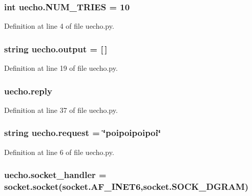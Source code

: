 \subsubsection[{\texorpdfstring{N\+U\+M\+\_\+\+T\+R\+I\+ES}{NUM_TRIES}}]{\setlength{\rightskip}{0pt plus 5cm}int uecho.\+N\+U\+M\+\_\+\+T\+R\+I\+ES = 10}\hypertarget{namespaceuecho_a76eb795f8c12b741184046c46e54e51e}{}\label{namespaceuecho_a76eb795f8c12b741184046c46e54e51e}


Definition at line 4 of file uecho.\+py.

\subsubsection[{\texorpdfstring{output}{output}}]{\setlength{\rightskip}{0pt plus 5cm}string uecho.\+output = \mbox{[}$\,$\mbox{]}}\hypertarget{namespaceuecho_ab51ccd7dd71101925a65714c9b6b3ab5}{}\label{namespaceuecho_ab51ccd7dd71101925a65714c9b6b3ab5}


Definition at line 19 of file uecho.\+py.

\subsubsection[{\texorpdfstring{reply}{reply}}]{\setlength{\rightskip}{0pt plus 5cm}uecho.\+reply}\hypertarget{namespaceuecho_a14d3176a6ac905682e83c66c9f1d7126}{}\label{namespaceuecho_a14d3176a6ac905682e83c66c9f1d7126}


Definition at line 37 of file uecho.\+py.

\subsubsection[{\texorpdfstring{request}{request}}]{\setlength{\rightskip}{0pt plus 5cm}string uecho.\+request = \char`\"{}poipoipoipoi\char`\"{}}\hypertarget{namespaceuecho_afdb3394ff38586a5548fae77f0aa228e}{}\label{namespaceuecho_afdb3394ff38586a5548fae77f0aa228e}


Definition at line 6 of file uecho.\+py.

\subsubsection[{\texorpdfstring{socket\+\_\+handler}{socket_handler}}]{\setlength{\rightskip}{0pt plus 5cm}uecho.\+socket\+\_\+handler = socket.\+socket(socket.\+A\+F\+\_\+\+I\+N\+E\+T6,socket.\+S\+O\+C\+K\+\_\+\+D\+G\+R\+AM)}\hypertarget{namespaceuecho_aa5a95d12013654731fbb8b4470a1c5c3}{}\label{namespaceuecho_aa5a95d12013654731fbb8b4470a1c5c3}


